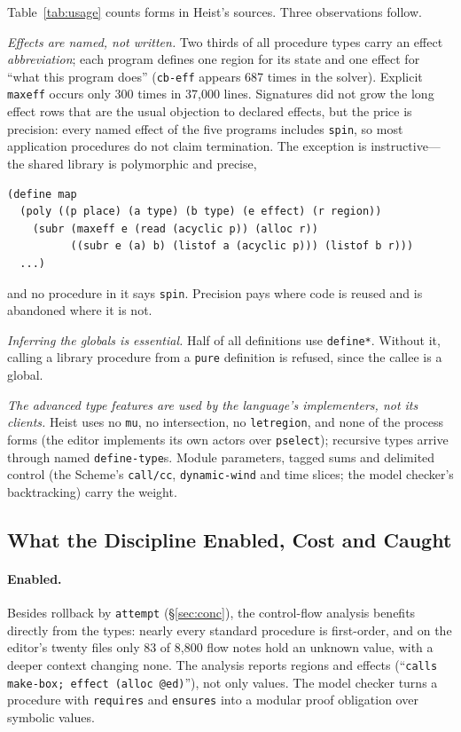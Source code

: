 \documentclass[acmsmall,screen,review]{acmart}
\newcommand{\cd}[1]{\texttt{#1}}
\begin{document}
Table~\ref{tab:usage} counts forms in Heist's sources. Three
observations follow.

\emph{Effects are named, not written.} Two thirds of all procedure
types carry an effect \emph{abbreviation}; each program defines one
region for its state and one effect for ``what this program does''
(\cd{cb-eff} appears 687 times in the solver). Explicit \cd{maxeff}
occurs only 300 times in 37,000 lines. Signatures did not grow the long
effect rows that are the usual objection to declared effects, but the
price is precision: every named effect of the five programs includes
\cd{spin}, so most application procedures do not claim termination. The exception is
instructive---the shared library is polymorphic and precise,
\begin{lstlisting}
(define map
  (poly ((p place) (a type) (b type) (e effect) (r region))
    (subr (maxeff e (read (acyclic p)) (alloc r))
          ((subr e (a) b) (listof a (acyclic p))) (listof b r)))
  ...)
\end{lstlisting}
and no procedure in it says \cd{spin}. Precision pays where code is
reused and is abandoned where it is not.

\emph{Inferring the globals is essential.} Half of all definitions use
\cd{define*}. Without it, calling a library procedure from a \cd{pure}
definition is refused, since the callee is a global.

\emph{The advanced type features are used by the language's
implementers, not its clients.} Heist uses no \cd{mu}, no intersection,
no \cd{letregion}, and none of the process forms (the editor implements
its own actors over \cd{pselect}); recursive types arrive through named
\cd{define-type}s. Module parameters, tagged sums and delimited control
(the Scheme's \cd{call/cc}, \cd{dynamic-wind} and time slices; the
model checker's backtracking) carry the weight.

\subsection{What the Discipline Enabled, Cost and Caught}

\paragraph{Enabled.} Besides rollback by \cd{attempt}
(\S\ref{sec:conc}), the control-flow analysis benefits directly from
the types: nearly every standard procedure is first-order, and on the
editor's twenty files only 83 of 8,800 flow notes hold an unknown
value, with a deeper context changing none. The analysis reports
regions and effects (``\cd{calls make-box; effect (alloc @ed)}''), not
only values. The model checker turns a procedure with \cd{requires}
and \cd{ensures} into a modular proof obligation over symbolic values.
\end{document}
